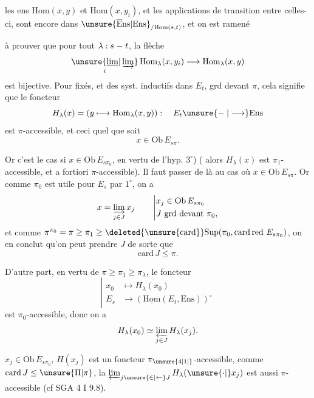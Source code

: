   les ens $\mathrm{Hom}(x,y)$ et $\mathrm{Hom}(x,y_i)$, et les  applications de transition entre celles-ci, sont encore dans $\unsure{\overline{\mathrm E}\mathrm{ns}|\mathrm{Ens}}_{/\mathrm{Hom}(s,t)}$, et on est ramené

à prouver que pour tout $\lambda:s\relbar t$, la flèche
\[\underset i{\unsure{\underline{\lim}|\varinjlim}}\,\mathrm{Hom}_{\lambda}(x,y_i)\longrightarrow\mathrm{Hom}_{\lambda}(x,y)\]
est bijective. Pour    fixés, et des syst. inductifs  dans $E_t$, grd devant $\pi$, cela signifie que le foncteur
\[H_\lambda(x)=(y\longmapsto\mathrm{Hom}_\lambda(x,y)):\quad E_t\unsure{\relbar|\longrightarrow}\mathrm{Ens}\]
est $\pi$-accessible, et ceci quel que soit
\[x\in\mathrm{Ob}\,E_{s\pi}.\]

Or c'est le cas si $x\in\mathrm{Ob}\,E_{s\pi_0}$, en vertu de l'hyp. $3^\circ$) ( alors $H_\lambda(x)$ est $\pi_1$-accessible, et a fortiori $\pi$-accessible). Il faut  passer de là au cas où $x\in\mathrm{Ob}\,E_{s\pi}$. Or comme $\pi_0$ est utile pour $E_s$ par $1^\circ$, on a
\[x=\varinjlim_{j\in J}x_j\qquad\left|\begin{aligned}&x_j\in\mathrm{Ob}\,E_{s\pi_0}\\&J\ \text{grd devant }\pi_0,\end{aligned}\right.\]
et comme   $\pi^{\pi_0}=\pi\geq\pi_1\geq\deleted{\unsure{\mathrm{card}}}\mathrm{Sup}(\pi_0,\mathrm{card\,red}\ E_{s\pi_0})$, on en conclut qu'on peut prendre $J$ de sorte que
\[\mathrm{card}\,J\leq\pi.\]

D'autre part, en vertu de $\pi\geq\pi_1\geq\pi_\lambda$, le foncteur
\[\left|\begin{aligned}x_0&\longmapsto H_\lambda(x_0)\\ E_s&\longrightarrow(\underline{\mathrm{Hom}}(E_t,\mathrm{Ens}))^\circ\end{aligned}\right.\]
est $\pi_0$-accessible, donc on a
\[H_\lambda(x_0)\simeq\varprojlim_{j\in J}H_\lambda(x_j).\]

 $x_j\in\mathrm{Ob}\,E_{s\pi_0}$, $H(x_j)$ est un foncteur $\pi_{\unsure{4|1|{}}}$-accessible,  comme $\mathrm{card}\,J\leq\unsure{\Pi|\pi}$, la $\varprojlim_{j\unsure{\in|{\leftarrow}}J}H_\lambda(\unsure{\cdot|{}}x_j)$ est aussi $\pi$-accessible (cf SGA 4 I 9.8).


